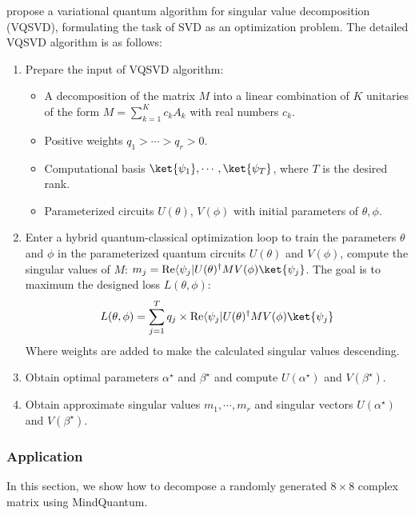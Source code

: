 \cite{wang2021variational} propose a variational quantum algorithm for singular value decomposition (VQSVD), formulating the task of SVD as an optimization problem. The detailed VQSVD algorithm is as follows: 
\begin{enumerate}
    \item Prepare the input of VQSVD algorithm: 
        \begin{itemize}
            \item A decomposition of the matrix $M$ into a linear combination of $K$ unitaries of the form $M = \sum_{k=1}^K c_k A_k$ with real numbers $c_k$. 
            \item Positive weights $q_1 > \cdots > q_r > 0$. 
            \item Computational basis {$\ket{\psi_1}, \cdots, \ket{\psi_T}$}, where $T$ is the desired rank. 
            \item Parameterized circuits $U(\theta)$, $V(\phi)$ with initial parameters of $\theta, \phi$. 
        \end{itemize}
    \item Enter a hybrid quantum-classical optimization loop to train the parameters $\theta$ and $\phi$ in the parameterized quantum circuits $U(\theta)$ and $V(\phi)$, compute the singular values of $M$: $m_j = \text{Re}\langle\psi_j|U(\theta)^{\dagger} M V(\phi)\ket{\psi_j}$. The goal is to maximum the designed loss $L(\theta, \phi)$: 
    \begin{equation}
        L(\theta, \phi) = \sum_{j=1}^T q_j \times \text{Re} \langle\psi_j| U(\theta)^{\dagger} M V(\phi)\ket{\psi_j}
    \end{equation}
    Where weights are added to make the calculated singular values descending. 
    \item Obtain optimal parameters $\alpha^ \star$ and $\beta^\star$ and compute $U(\alpha^\star)$ and $V(\beta^\star)$. 
    \item Obtain approximate singular values ${m_1, \cdots, m_r}$ and  singular vectors $U(\alpha^\star)$ and $V(\beta^\star)$. 
\end{enumerate}

\subsubsection{Application}
In this section, we show how to decompose a randomly generated $8 \times 8$ complex matrix using MindQuantum. 

